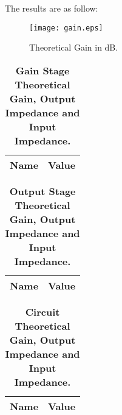 The results are as follow:

\begin{figure}[h] 
\centering
\texttt{[image: gain.eps]}
\caption{Theoretical Gain in dB.}
\label{Fig2: TheoGaindB}
\end{figure}

\begin{table}[H]
\centering
\begin{tabular}{|l|l|}
\hline
{\bf Name} & {\bf Value} \\ \hline
    
\end{tabular}
\caption{\textbf{Gain Stage Theoretical Gain, Output Impedance and Input Impedance.}}
\end{table}

\begin{table}[H]
\centering
\begin{tabular}{|l|l|}
\hline
{\bf Name} & {\bf Value} \\ \hline
    
\end{tabular}
\caption{\textbf{Output Stage Theoretical Gain, Output Impedance and Input Impedance.}}
\end{table}

\begin{table}[H]
\centering
\begin{tabular}{|l|l|}
\hline
{\bf Name} & {\bf Value} \\ \hline
    
\end{tabular}
\caption{\textbf{Circuit Theoretical Gain, Output Impedance and Input Impedance.}}
\end{table}
